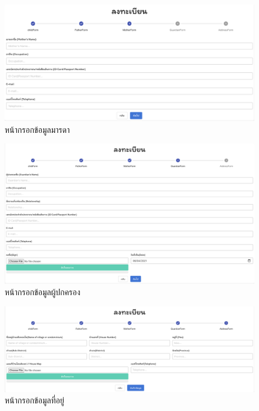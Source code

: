   \begin{figure}
    \begin{center}
    \includegraphics[width=\linewidth]{images/motherForm.png}
    \end{center}
    \caption[หน้ากรอกข้อมูลมารดา]{หน้ากรอกข้อมูลมารดา}
    \label{fig:motherForm}
  \end{figure}


  \begin{figure}
    \begin{center}
    \includegraphics[width=\linewidth]{images/guardiansForm.png}
    \end{center}
    \caption[หน้ากรอกข้อมูลผู้ปกครอง]{หน้ากรอกข้อมูลผู้ปกครอง}
    \label{fig:guardiansForm}
  \end{figure}


  \begin{figure}
    \begin{center}
    \includegraphics[width=\linewidth]{images/addressForm.png}
    \end{center}
    \caption[หน้ากรอกข้อมูลที่อยู่]{หน้ากรอกข้อมูลที่อยู่}
    \label{fig:addressForm}
  \end{figure}

